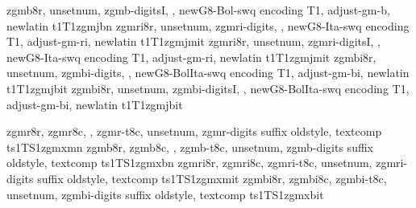 {zgmb8r,%
unsetnum,%
zgmb-digitsI,%
\metrics {},%
newG8-Bol-swq encoding T1,%
adjust-gm-b,%
newlatin}
{t1}{T1}{zgmj}{b}{n}{}
%
{zgmri8r,%
unsetnum,%
zgmri-digits,%
\metrics {},%
newG8-Ita-swq encoding T1,%
adjust-gm-ri,%
newlatin}
{t1}{T1}{zgmj}{m}{it}{}
%
{zgmri8r,%
unsetnum,%
zgmri-digitsI,%
\metrics {},%
newG8-Ita-swq encoding T1,%
adjust-gm-ri,%
newlatin}
{t1}{T1}{zgmj}{m}{it}{}
%
{zgmbi8r,%
unsetnum,%
zgmbi-digits,%
\metrics {},%
newG8-BolIta-swq encoding T1,%
adjust-gm-bi,%
newlatin}
{t1}{T1}{zgmj}{b}{it}{}
%
{zgmbi8r,%
unsetnum,%
zgmbi-digitsI,%
\metrics {},%
newG8-BolIta-swq encoding T1,%
adjust-gm-bi,%
newlatin}
{t1}{T1}{zgmj}{b}{it}{}

%
{zgmr8r,%
zgmr8c,%
\metrics {}, %
zgmr-t8c,%
unsetnum,%
zgmr-digits suffix oldstyle,%
textcomp}
{ts1}{TS1}{zgmx}{m}{n}{}
%
{zgmb8r,%
zgmb8c,%
\metrics {}, %
zgmb-t8c,%
unsetnum,%
zgmb-digits suffix oldstyle,%
textcomp}
{ts1}{TS1}{zgmx}{b}{n}{}
%
{zgmri8r,%
zgmri8c,%
zgmri-t8c,%
unsetnum,%
zgmri-digits suffix oldstyle,%
textcomp}
{ts1}{TS1}{zgmx}{m}{it}{}
%
{zgmbi8r,%
zgmbi8c,%
zgmbi-t8c,%
unsetnum,%
zgmbi-digits suffix oldstyle,%
textcomp}
{ts1}{TS1}{zgmx}{b}{it}{}


\endinstallfonts
\endrecordtransforms
\bye
